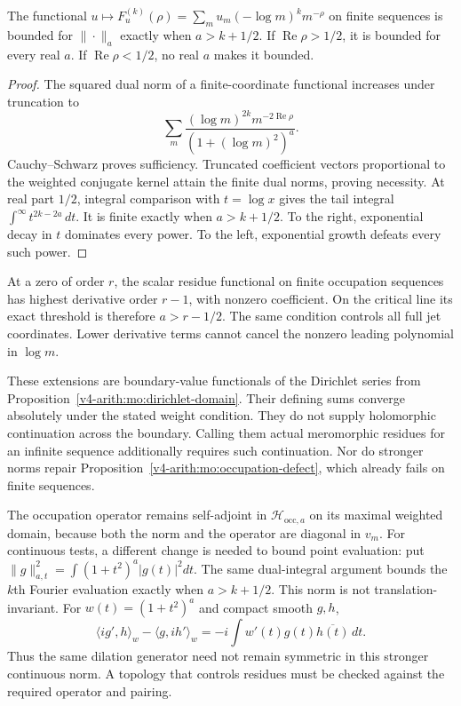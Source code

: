 \begin{proposition}
\label{v4-arith:mo:weight-threshold}
The functional
$u\mapsto F_u^{(k)}(\rho)=\sum_m u_m(-\log m)^k m^{-\rho}$
on finite sequences is bounded for $\|\cdot\|_a$ exactly when
$a>k+1/2$. If $\operatorname{Re}\rho>1/2$, it is bounded for
every real $a$. If $\operatorname{Re}\rho<1/2$, no real $a$
makes it bounded.
\end{proposition}
\begin{proof}
The squared dual norm of a finite-coordinate functional increases
under truncation to
\[
 \sum_m\frac{(\log m)^{2k}m^{-2\operatorname{Re}\rho}}
                    {(1+(\log m)^2)^a}.
\]
Cauchy--Schwarz proves sufficiency. Truncated coefficient vectors
proportional to the weighted conjugate kernel attain the finite
dual norms, proving necessity. At real part $1/2$, integral
comparison with $t=\log x$ gives the tail integral
$\int^\infty t^{2k-2a}\,dt$. It is finite exactly when
$a>k+1/2$. To the right, exponential decay in $t$ dominates every
power. To the left, exponential growth defeats every such power.
\end{proof}

At a zero of order $r$, the scalar residue functional on finite
occupation sequences has highest derivative order $r-1$, with
nonzero coefficient. On the critical line its exact threshold
is therefore $a>r-1/2$. The same condition controls all full jet
coordinates. Lower derivative terms cannot cancel the nonzero
leading polynomial in $\log m$.

These extensions are boundary-value functionals of the Dirichlet
series from Proposition~\ref{v4-arith:mo:dirichlet-domain}. Their defining sums converge
absolutely under the stated weight condition. They do not supply
holomorphic continuation across the boundary. Calling them actual
meromorphic residues for an infinite sequence additionally requires
such continuation. Nor do stronger norms repair
Proposition~\ref{v4-arith:mo:occupation-defect}, which already fails on finite sequences.

The occupation operator remains self-adjoint in
$\mathscr H_{\mathrm{occ},a}$ on its maximal weighted domain,
because both the norm and the operator are diagonal in $v_m$.
For continuous tests, a different change is needed to bound point
evaluation: put $\|g\|_{a,t}^2=\int(1+t^2)^a|g(t)|^2dt$.
The same dual-integral argument bounds the $k$th Fourier evaluation
exactly when $a>k+1/2$. This norm is not translation-invariant.
For $w(t)=(1+t^2)^a$ and compact smooth $g,h$,
\[
 \langle i g',h\rangle_w-\langle g,i h'\rangle_w
 =-i\int w'(t)g(t)\overline{h(t)}\,dt.
\]
Thus the same dilation generator need not remain symmetric in
this stronger continuous norm. A topology that controls residues
must be checked against the required operator and pairing.

